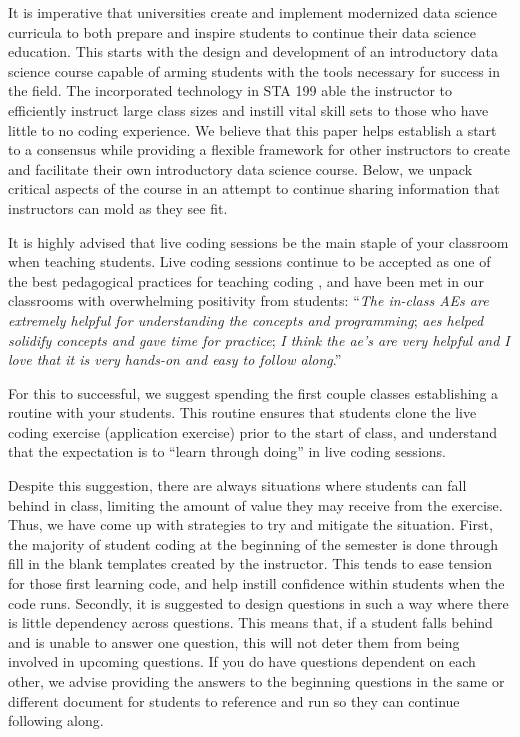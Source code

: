 \documentclass[
  12pt]{article}
\begin{document}
It is imperative that universities create and implement modernized data
science curricula to both prepare and inspire students to continue their
data science education. This starts with the design and development of
an introductory data science course capable of arming students with the
tools necessary for success in the field. The incorporated technology in
STA 199 able the instructor to efficiently instruct large class sizes
and instill vital skill sets to those who have little to no coding
experience. We believe that this paper helps establish a start to a
consensus while providing a flexible framework for other instructors to
create and facilitate their own introductory data science course. Below,
we unpack critical aspects of the course in an attempt to continue
sharing information that instructors can mold as they see fit.

It is highly advised that live coding sessions be the main staple of
your classroom when teaching students. Live coding sessions continue to
be accepted as one of the best pedagogical practices for teaching coding
\citep{Selvaraj2021}, and have been met in our classrooms with
overwhelming positivity from students: ``\emph{The in-class AEs are
extremely helpful for understanding the concepts and programming};
\emph{aes helped solidify concepts and gave time for practice}; \emph{I
think the ae's are very helpful and I love that it is very hands-on and
easy to follow along}.''

For this to successful, we suggest spending the first couple classes
establishing a routine with your students. This routine ensures that
students clone the live coding exercise (application exercise) prior to
the start of class, and understand that the expectation is to ``learn
through doing'' in live coding sessions.

Despite this suggestion, there are always situations where students can
fall behind in class, limiting the amount of value they may receive from
the exercise. Thus, we have come up with strategies to try and mitigate
the situation. First, the majority of student coding at the beginning of
the semester is done through fill in the blank templates created by the
instructor. This tends to ease tension for those first learning code,
and help instill confidence within students when the code runs.
Secondly, it is suggested to design questions in such a way where there
is little dependency across questions. This means that, if a student
falls behind and is unable to answer one question, this will not deter
them from being involved in upcoming questions. If you do have questions
dependent on each other, we advise providing the answers to the
beginning questions in the same or different document for students to
reference and run so they can continue following along.
\end{document}
